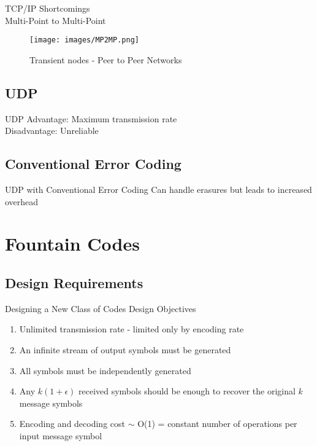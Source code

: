 \documentclass[handout,11pt]{beamer}
\begin{document}
\begin{frame}{TCP/IP Shortcomings\\Multi-Point to Multi-Point}

\begin{figure}
    \centering
    \texttt{[image: images/MP2MP.png]}
    \caption{Transient nodes - Peer to Peer Networks}
    \label{fig:my_label}
\end{figure}

\end{frame}

\subsection{UDP}
\begin{frame}{UDP}
Advantage: Maximum transmission rate\\
Disadvantage: Unreliable
\end{frame}

\subsection{Conventional Error Coding}
\begin{frame}{UDP with Conventional Error Coding}
Can handle erasures but leads to increased overhead
\end{frame}

\section{Fountain Codes}
\subsection{Design Requirements}
\begin{frame}{Designing a New Class of Codes}
Design Objectives
\begin{enumerate}
    \item Unlimited transmission rate - limited only by encoding rate
    \pause
    \item An infinite stream of output symbols must be generated
    \pause
    \item All symbols must be independently generated
    \pause
    \item Any $k(1+\epsilon)$ received symbols should be enough to recover the original $k$ message symbols
    \pause
    \item Encoding and decoding cost $\mathtt{\sim}$ O(1) = constant number of operations per input message symbol 
\end{enumerate}

\end{frame}
\end{document}
